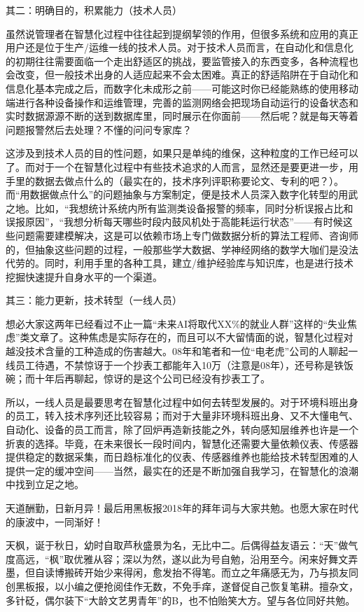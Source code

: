 \documentclass[]{book}
\begin{document}
其二：明确目的，积累能力（技术人员）

虽然说管理者在智慧化过程中往往起到提纲挈领的作用，但很多系统和应用的真正用户还是位于生产/运维一线的技术人员。对于技术人员而言，在自动化和信息化的初期往往需要面临一个走出舒适区的挑战，要监管接入的东西变多，各种流程也会改变，但一般技术出身的人适应起来不会太困难。真正的舒适陷阱在于自动化和信息化基本完成之后，而数字化未成形之前------可能这时你已经能熟练的使用移动端进行各种设备操作和运维管理，完善的监测网络会把现场自动运行的设备状态和实时数据源源不断的送到数据库里，同时展示在你面前------然后呢？就是每天等着问题报警然后去处理？不懂的问问专家库？

这涉及到技术人员的目的性问题，如果只是单纯的维保，这种粒度的工作已经可以了。而对于一个在智慧化过程中有些技术追求的人而言，显然还是要更进一步，用手里的数据去做点什么的（最实在的，技术序列评职称要论文、专利的吧？）。而``用数据做点什么''的问题抽象与方案制定，便是技术人员深入数字化转型的用武之地。比如，``我想统计系统内所有监测类设备报警的频率，同时分析误报占比和误报原因''，``我想分析每天哪些时段内鼓风机处于高能耗运行状态''------有时候这些问题需要建模解决，这是可以依赖市场上专门做数据分析的算法工程师、咨询师的，但抽象这些问题的过程，一般那些学大数据、学神经网络的数学大咖们是没法代劳的。同时，利用手里的各种工具，建立/维护经验库与知识库，也是进行技术挖掘快速提升自身水平的一个渠道。

其三：能力更新，技术转型（一线人员）

想必大家这两年已经看过不止一篇``未来AI将取代XX\%的就业人群''这样的``失业焦虑''类文章了。这种焦虑是实际存在的，而且可以不大留情面的说，智慧化过程对越没技术含量的工种造成的伤害越大。08年和笔者和一位``电老虎''公司的人聊起一线员工待遇，不禁惊讶于一个抄表工都能年入10万（注意是08年），还号称是铁饭碗；而十年后再聊起，惊讶的是这个公司已经没有抄表工了。

所以，一线人员是最要思考在智慧化过程中如何去转型发展的。对于环境科班出身的员工，转入技术序列还比较容易；而对于大量非环境科班出身、又不大懂电气、自动化、设备的员工而言，除了回炉再造新技能之外，转向感知层维养也许是一个折衷的选择。毕竟，在未来很长一段时间内，智慧化还需要大量依赖仪表、传感器提供稳定的数据采集，而日趋标准化的仪表、传感器维养也能给技术转型困难的人提供一定的缓冲空间------当然，最实在的还是不断加强自我学习，在智慧化的浪潮中找到立足之地。

天道酬勤，日新月异！最后用黑板报2018年的拜年词与大家共勉。也愿大家在时代的康波中，一同渐好！

天枫，诞于秋日，幼时自取芦秋盛景为名，无比中二。后偶得益友语云：``天''做气度高远，``枫''取优雅从容；深以为然，遂以此为号自勉，沿用至今。闲来好舞文弄墨，但自读博搬砖开始少来得闲，愈发抬不得笔。而立之年痛感无为，乃与损友同创黑板报，以小编之便抢阅佳作无数，不免手痒，遂督促自己恢复笔耕。擅杂文，多针砭，偶尔装下``大龄文艺男青年''的B，也不怕贻笑大方。望与各位同好共勉。
\end{document}
